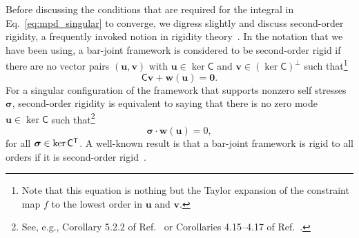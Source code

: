 Before discussing the conditions that are required for the integral in Eq.~\eqref{eq:mpd_singular} to converge, we digress slightly and discuss second-order rigidity, a frequently invoked notion in rigidity theory~\cite{connelly1994,connelly1996}.
In the notation that we have been using, a bar-joint framework is considered to be second-order rigid if there are no vector pairs $(\bm{u}, \bm{v})$ with $\bm{u} \in \ker\mathsf{C}$ and $\bm{v} \in (\ker\mathsf{C})^{\perp}$ such that\footnote{Note that this equation is nothing but the Taylor expansion of the constraint map $f$ to the lowest order in $\bm{u}$ and $\bm{v}$.}
%
\begin{equation}
  \mathsf{C}\bm{v} + \bm{w}(\bm{u}) = \bm{0}.
\end{equation}
%
For a singular configuration of the framework that supports nonzero self stresses $\bm{\sigma}$, second-order rigidity is equivalent to saying that there is no zero mode $\bm{u} \in \ker\mathsf{C}$ such that\footnote{See, e.g., Corollary 5.2.2 of Ref.~\cite{connelly1996} or Corollaries 4.15--4.17 of Ref.~\cite{williams2003}.}
%
\begin{equation}
  \bm{\sigma}\cdot\bm{w}(\bm{u}) = 0,\label{sm:eq:2ndorder}
\end{equation}
%
for all $\bm{\sigma} \in \ker\mathsf{C}^\mathsf{T}$.
A well-known result is that a bar-joint framework is rigid to all orders if it is second-order rigid~\cite{connelly1996}.

